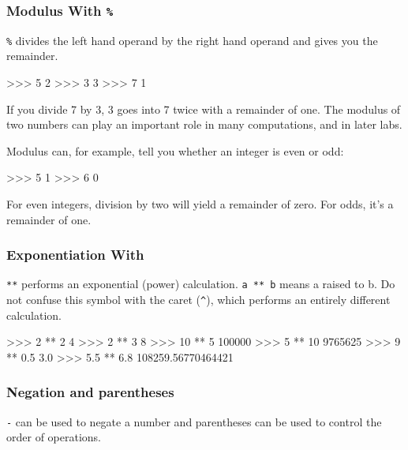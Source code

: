 \documentclass[11pt]{cselabheader}
\begin{document}
\subsubsection{Modulus With \texttt{\%}}

\texttt{\%} divides the
left hand operand by the right hand operand and gives you the
remainder.

\begin{pyconcode}
>>> 5 %
2
>>> 3 %
3
>>> 7 %
1

\end{pyconcode}

If you divide 7 by 3, 3 goes into 7
twice with a remainder of one. The modulus of two numbers can play an important
role in many computations, and in later labs.

Modulus can, for example, tell you whether an integer is even or odd:

\begin{pyconcode}
>>> 5 %
1
>>> 6 %
0

\end{pyconcode}

For even integers, division by two will yield a remainder of zero.
For odds, it's a remainder of one.

\subsubsection{Exponentiation With \pythoninline{**}}

\texttt{**}
performs an exponential (power) calculation.  \texttt{a ** b} means a
raised to b. Do not confuse this symbol with the caret (\texttt{\^}),
which performs an entirely different calculation.

\begin{pyconcode}
>>> 2 ** 2
4
>>> 2 ** 3
8
>>> 10 ** 5
100000
>>> 5 ** 10
9765625
>>> 9 ** 0.5
3.0
>>> 5.5 ** 6.8
108259.56770464421

\end{pyconcode}

\subsubsection{Negation and parentheses}

\texttt{-}
can be used to negate a number and
parentheses can be used to control the order of
operations.
\end{document}
